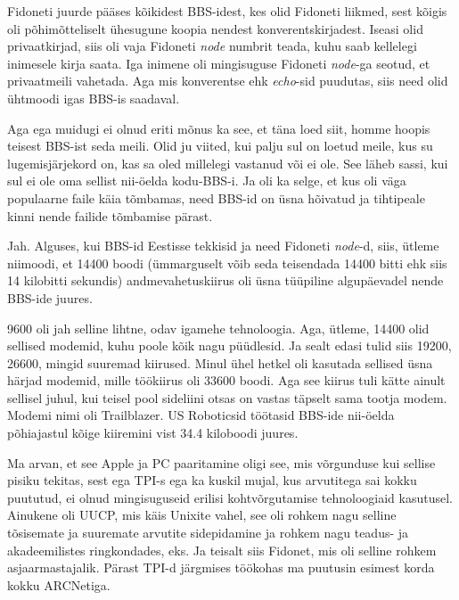 Fidoneti juurde pääses kõikidest BBS-idest, kes olid Fidoneti liikmed, sest 
kõigis oli põhimõtteliselt ühesugune koopia nendest konverentskirjadest. 
Iseasi olid privaatkirjad, siis oli  vaja Fidoneti \emph{node} numbrit teada, 
kuhu saab kellelegi inimesele kirja saata. Iga inimene oli  mingisuguse 
Fidoneti \emph{node}-ga seotud, et  privaatmeili vahetada. Aga mis konverentse 
ehk \emph{echo}-sid puudutas,  siis need  olid ühtmoodi igas BBS-is  saadaval.

Aga ega muidugi ei olnud eriti mõnus ka see, et täna loed siit, homme  hoopis 
teisest BBS-ist seda meili. Olid ju viited, kui palju sul on loetud meile, kus 
su lugemisjärjekord on, kas sa oled millelegi vastanud või ei ole. See  läheb 
sassi, kui sul ei ole oma sellist nii-öelda kodu-BBS-i. Ja oli ka selge, et kus 
oli väga populaarne faile käia tõmbamas,  need BBS-id on  üsna hõivatud ja 
tihtipeale kinni nende failide tõmbamise pärast. 


Jah. Alguses, kui BBS-id Eestisse tekkisid ja need Fidoneti \emph{node}-d, 
siis, ütleme niimoodi, et 14400 boodi (ümmarguselt võib seda teisendada 14400 
bitti ehk siis 14 kilobitti sekundis) andmevahetuskiirus oli üsna tüüpiline  
algupäevadel nende BBS-ide juures.


9600 oli jah selline lihtne, odav igamehe tehnoloogia. Aga, ütleme, 14400 olid 
sellised modemid, kuhu poole kõik nagu püüdlesid. Ja sealt edasi tulid siis 
19200, 26600, mingid suuremad kiirused. Minul ühel hetkel oli kasutada sellised 
üsna  härjad modemid, mille töökiirus oli 33600 boodi. Aga see kiirus tuli 
kätte ainult sellisel juhul, kui teisel pool sideliini otsas on vastas täpselt 
sama tootja modem. Modemi  nimi oli Trailblazer. US Roboticsid  töötasid BBS-ide 
nii-öelda  põhiajastul kõige kiiremini vist 34.4 kiloboodi juures.


Ma arvan, et see Apple ja PC paaritamine oligi see, mis  võrgunduse kui sellise 
pisiku tekitas, sest ega TPI-s ega ka kuskil mujal, kus arvutitega sai kokku 
puututud, ei olnud mingisuguseid erilisi kohtvõrgutamise tehnoloogiaid 
kasutusel. Ainukene oli UUCP, mis käis Unixite vahel, see oli rohkem nagu 
selline tõsisemate ja suuremate arvutite sidepidamine  ja rohkem nagu teadus- 
ja akadeemilistes ringkondades, eks. Ja teisalt siis Fidonet, mis oli selline 
rohkem asjaarmastajalik. Pärast TPI-d järgmises töökohas ma  puutusin esimest 
korda kokku ARCNetiga.

